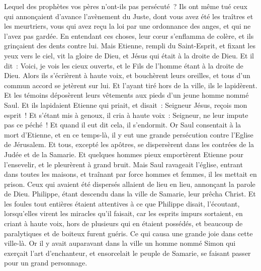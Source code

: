 \begin{multicols}{2}
Lequel des prophètes vos pères n'ont-ils pas persécuté~? Ils ont même tué ceux qui annonçaient d'avance l'avènement du Juste, dont vous avez été les traîtres et les meurtriers,
vous qui avez reçu la loi par une ordonnance des anges, et qui ne l'avez pas gardée.
En entendant ces choses, leur cœur s'enflamma de colère, et ils grinçaient des dents contre lui.
Mais Etienne, rempli du Saint-Esprit, et fixant les yeux vers le ciel, vit la gloire de Dieu, et Jésus qui était à la droite de Dieu.
Et il dit~: Voici, je vois les cieux ouverts, et le Fils de l'homme étant à la droite de Dieu.
Alors ils s'écrièrent à haute voix, et bouchèrent leurs oreilles, et tous d'un commun accord se jetèrent sur lui.
Et l'ayant tiré hors de la ville, ils le lapidèrent. Et les témoins déposèrent leurs vêtements aux pieds d'un jeune homme nommé Saul.
Et ils lapidaient Etienne qui priait, et disait~: Seigneur Jésus, reçois mon esprit~!
Et s'étant mis à genoux, il cria à haute voix~: Seigneur, ne leur impute pas ce péché~! Et quand il eut dit cela, il s'endormit.
\VerseOne{}Or Saul consentait à la mort d'Etienne, et en ce temps-là, il y eut une grande persécution contre l'Eglise de Jérusalem. Et tous, excepté les apôtres, se dispersèrent dans les contrées de la Judée et de la Samarie.
Et quelques hommes pieux emportèrent Etienne pour l'ensevelir, et le pleurèrent à grand bruit.
Mais Saul ravageait l'église, entrant dans toutes les maisons, et traînant par force hommes et femmes, il les mettait en prison.
Ceux qui avaient été dispersés allaient de lieu en lieu, annonçant la parole de Dieu.
Philippe, étant descendu dans la ville de Samarie, leur prêcha Christ.
Et les foules tout entières étaient attentives à ce que Philippe disait, l'écoutant, lorsqu'elles virent les miracles qu'il faisait,
car les esprits impurs sortaient, en criant à haute voix, hors de plusieurs qui en étaient possédés, et beaucoup de paralytiques et de boiteux furent guéris.
Ce qui causa une grande joie dans cette ville-là.
Or il y avait auparavant dans la ville un homme nommé Simon qui exerçait l'art d'enchanteur, et ensorcelait le peuple de Samarie, se faisant passer pour un grand personnage.

\end{multicols}
